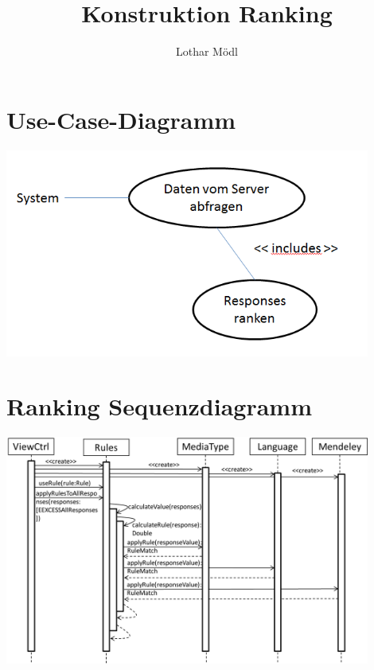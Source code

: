 
\title{Konstruktion Ranking}
\author{Lothar Mödl}

\section{Use-Case-Diagramm}

\includegraphics[width=12cm]{Pics/use-case}

\section{Ranking Sequenzdiagramm}

\includegraphics[width=12cm]{Pics/Sequenzdiagramm_Ranking}

